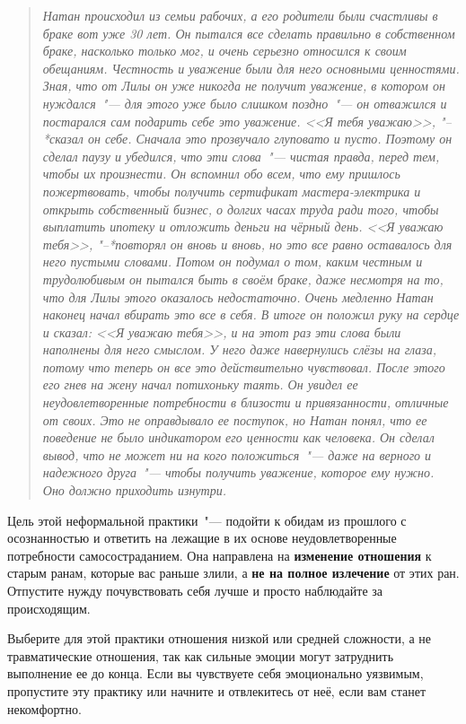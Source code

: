 \begin{quotation}
	\textit{
		Натан происходил из семьи рабочих, а его родители были счастливы в браке вот уже 30 лет. Он пытался все сделать правильно в собственном браке, насколько только мог, и очень серьезно относился к своим обещаниям. Честность и уважение были для него основными ценностями. Зная, что от Лилы он уже никогда не получит уважение, в котором он нуждался~"--- для этого уже было слишком поздно~"--- он отважился и постарался сам подарить себе это уважение. <<Я тебя уважаю>>, "--*сказал он себе. Сначала это прозвучало глуповато и пусто. Поэтому он сделал паузу и убедился, что эти слова~"--- чистая правда, перед тем, чтобы их произнести. Он вспомнил обо всем, что ему пришлось пожертвовать, чтобы получить сертификат мастера-электрика и открыть собственный бизнес, о долгих часах труда ради того, чтобы выплатить ипотеку и отложить деньги на чёрный день. <<Я уважаю тебя>>, "--*повторял он вновь и вновь, но это все равно оставалось для него пустыми словами. Потом он подумал о том, каким честным и трудолюбивым он пытался быть в своём браке, даже несмотря на то, что для Лилы этого оказалось недостаточно. Очень медленно Натан наконец начал вбирать это все в себя. В итоге он положил руку на сердце и сказал: <<Я уважаю тебя>>, и на этот раз эти слова были наполнены для него смыслом. У него даже навернулись слёзы на глаза, потому что теперь он все это действительно чувствовал. После этого его гнев на жену начал потихоньку таять. Он увидел ее неудовлетворенные потребности в близости и привязанности, отличные от своих. Это не оправдывало ее поступок, но Натан понял, что ее поведение не было индикатором его ценности как человека. Он сделал вывод, что не может ни на кого положиться~"--- даже на верного и надежного друга~"--- чтобы получить уважение, которое ему нужно. Оно должно приходить изнутри.
	} 
\end{quotation}

\newpage
{} \label{Ex:Meeting_Unmet_Needs}

Цель этой неформальной практики~"--- подойти к обидам из прошлого с осознанностью и ответить на лежащие в их основе неудовлетворенные потребности самосостраданием. Она направлена на \textbf{изменение отношения} к старым ранам, которые вас раньше злили, а \textbf{не на полное излечение} от этих ран. Отпустите нужду почувствовать себя лучше и просто наблюдайте за происходящим.

Выберите для этой практики отношения низкой или средней сложности, а не травматические отношения, так как сильные эмоции могут затруднить выполнение ее до конца. Если вы чувствуете себя эмоционально уязвимым, пропустите эту практику или начните и отвлекитесь от неё, если вам станет некомфортно.

